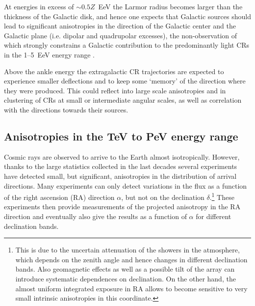 \documentclass[twoside,12pt]{article}
\begin{document}
At energies in excess of $\sim 0.5Z$~EeV the Larmor radius becomes larger than the thickness of the Galactic disk, and hence one expects that Galactic sources should lead to significant anisotropies in the direction of the Galactic center and the Galactic plane (i.e. dipolar and quadrupolar excesses), the non-observation of which strongly constrains a Galactic contribution to the predominantly light CRs in the 1--5~EeV energy range \cite{LS12}. 

Above the ankle energy the extragalactic CR trajectories are expected to experience smaller deflections and to keep some `memory' of the direction where they were produced. This could  reflect into large scale anisotropies and in  clustering of CRs at small or intermediate angular scales, as well as correlation with the directions towards their sources.

\subsection{Anisotropies in the TeV to PeV energy range}

Cosmic rays are observed to arrive to the Earth almost isotropically. However, thanks to the large statistics collected in the last decades several experiments have detected small, but significant, anisotropies in the distribution of arrival directions. Many experiments can only detect variations in the flux as a function of the right ascension (RA) direction $\alpha$, but not on the declination $\delta$.\footnote{This is due to the uncertain attenuation of the showers in the atmosphere, which depends on the zenith angle and hence changes in different declination bands. Also geomagnetic effects as well as a possible tilt of the array can introduce systematic dependences on declination. On the other hand, the almost uniform integrated exposure in RA allows to become sensitive to very small intrinsic anisotropies in this coordinate.} These experiments then provide measurements of the projected anisotropy in the RA direction and eventually also give the results as a function of $\alpha$ for different declination bands. 
\end{document}
